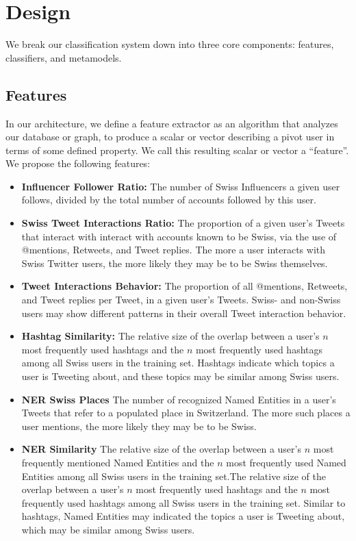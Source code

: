 \documentclass[10pt,a4paper]{article}
\begin{document}
\section{Design}
We break our classification system down into three core components: features, classifiers, and metamodels.

\subsection{Features}
In our architecture, we define a feature extractor as an algorithm that analyzes our database or graph, to produce a scalar or vector describing a pivot user in terms of some defined property. We call this resulting scalar or vector a “feature”. We propose the following features:
\begin{itemize}
\item \textbf{Influencer Follower Ratio:} The number of Swiss Influencers a given user follows, divided by the total number of accounts followed by this user.
\item \textbf{Swiss Tweet Interactions Ratio:} The proportion of a given user's Tweets that interact with interact with accounts known to be Swiss, via the use of @mentions, Retweets, and Tweet replies. The more a user interacts with Swiss Twitter users, the more likely they may be to be Swiss themselves.
\item \textbf{Tweet Interactions Behavior:} The proportion of all @mentions, Retweets, and Tweet replies per Tweet, in a given user's Tweets. Swiss- and non-Swiss users may show different patterns in their overall Tweet interaction behavior.
\item \textbf{Hashtag Similarity:} The relative size of the overlap between a user's $n$ most frequently used hashtags and the $n$ most frequently used hashtags among all Swiss users in the training set. Hashtags indicate which topics a user is Tweeting about, and these topics may be similar among Swiss users.
\item \textbf{NER Swiss Places} The number of recognized Named Entities in a user's Tweets that refer to a populated place in Switzerland. The more such places a user mentions, the more likely they may be to be Swiss.
\item \textbf{NER Similarity} The relative size of the overlap between a user's $n$ most frequently mentioned Named Entities and the $n$ most frequently used Named Entities among all Swiss users in the training set.The relative size of the overlap between a user's $n$ most frequently used hashtags and the $n$ most frequently used hashtags among all Swiss users in the training set. Similar to hashtags, Named Entities may indicated the topics a user is Tweeting about, which may be similar among Swiss users.

\end{itemize}
\end{document}
